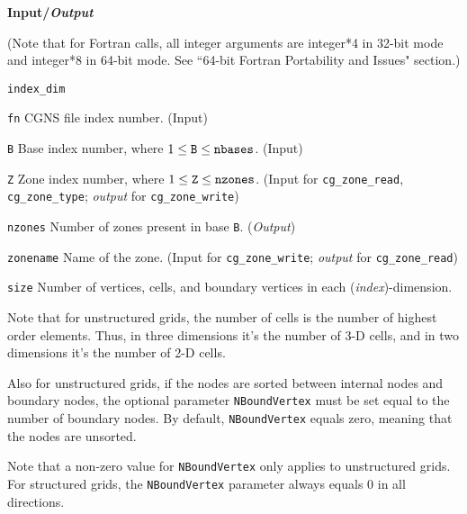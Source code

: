 \noindent
\textbf{\textcolor{input}{Input}/\textcolor{output}{\textit{Output}}}

\noindent (Note that for Fortran calls, all integer arguments are integer*4 in 32-bit mode and integer*8 in 64-bit mode.
See ``64-bit Fortran Portability and Issues" section.)

\begin{Ventryi}{\texttt{index\_dim}}\raggedright
\item [\texttt{fn}]
      CGNS file index number.
      (\textcolor{input}{Input})
\item [\texttt{B}]
      Base index number, where $1 \leq \text{\texttt{B}} \leq \text{\texttt{nbases}}$.
      (\textcolor{input}{Input})
\item [\texttt{Z}]
      Zone index number, where $1 \leq \text{\texttt{Z}} \leq \text{\texttt{nzones}}$.
      (\textcolor{input}{Input} for \texttt{cg\_zone\_read},
      \texttt{cg\_zone\_type}; \textcolor{output}{\textit{output}} for
      \texttt{cg\_zone\_write})
\item [\texttt{nzones}]
      Number of zones present in base \texttt{B}.
      (\textcolor{output}{\textit{Output}})
\item [\texttt{zonename}]
      Name of the zone.
      (\textcolor{input}{Input} for \texttt{cg\_zone\_write};
      \textcolor{output}{\textit{output}} for \texttt{cg\_zone\_read})
\item [\texttt{size}]
      Number of vertices, cells, and boundary vertices in each
      (\textit{index})-dimension.

      Note that for unstructured grids, the number of cells is the
      number of highest order elements.
      Thus, in three dimensions it's the number of 3-D cells, and in
      two dimensions it's the number of 2-D cells.

      Also for unstructured grids, if the nodes are sorted between
      internal nodes and boundary nodes, the optional parameter
      \texttt{NBoundVertex} must be set equal to the number of boundary
      nodes.
      By default, \texttt{NBoundVertex} equals zero, meaning that the
      nodes are unsorted.

      Note that a non-zero value for \texttt{NBoundVertex} only applies
      to unstructured grids.
      For structured grids, the \texttt{NBoundVertex} parameter always
      equals 0 in all directions.


\end{Ventryi}
